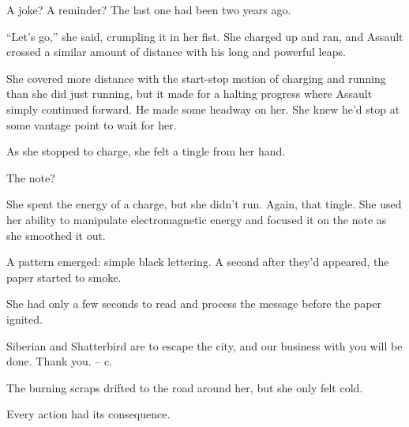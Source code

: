 A joke?  A reminder?  The last one had been two years ago.



``Let's go,'' she said, crumpling it in her fist.  She charged up and ran, and Assault crossed a similar amount of distance with his long and powerful leaps.



She covered more distance with the start-stop motion of charging and running than she did just running, but it made for a halting progress where Assault simply continued forward.  He made some headway on her.  She knew he'd stop at some vantage point to wait for her.



As she stopped to charge, she felt a tingle from her hand.



The note?



She spent the energy of a charge, but she didn't run.  Again, that tingle.  She used her ability to manipulate electromagnetic energy and focused it on the note as she smoothed it out.



A pattern emerged: simple black lettering.  A second after they'd appeared, the paper started to smoke.



She had only a few seconds to read and process the message before the paper ignited.



Siberian and Shatterbird are to escape the city, and our business with you will be done. Thank you.  – c.



The burning scraps drifted to the road around her, but she only felt cold.



Every action had its consequence.





